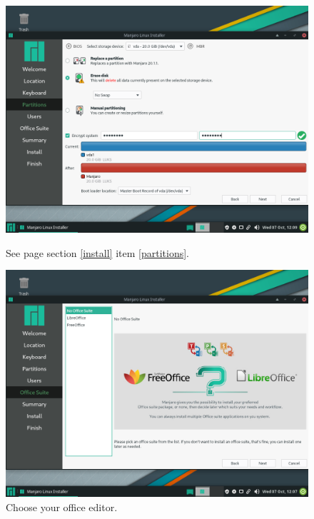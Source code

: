 \documentclass{article}
\begin{document}
\begin{figure}[ht!]
\begin{minipage}{0.5\textwidth}
        \includegraphics[width=.95\linewidth]{images/Choose_to_encrypt_your_system_to_avoid_any_snooping.png}
        \caption{See page \pageref{partitions} section \ref{install} item \ref{partitions}.}
        \label{fig:choosePartitioning}
    \end{minipage}\hfill
    \centering
    \begin{minipage}{0.5\textwidth}
        \includegraphics[width=.95\linewidth]{images/Choose_which_office_editor_you_want_if_any.png}
        \caption{Choose your office editor.}
        \label{fig:chooseOffice}
    \end{minipage}\hfill
\end{figure}
\end{document}
